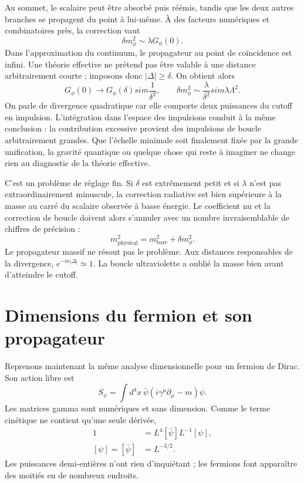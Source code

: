Au sommet, le scalaire peut être absorbé puis réémis, tandis que les deux autres branches se propagent du point à lui-même. À des facteurs numériques et combinatoires près, la correction vaut
\begin{equation}
\delta m_\phi^2\sim \lambda G_\phi(0).
\end{equation}
Dans l’approximation du continuum, le propagateur au point de coïncidence est infini. Une théorie effective ne prétend pas être valable à une distance arbitrairement courte ; imposons donc \(|\Delta|\geq\delta\). On obtient alors
\begin{equation}
G_\phi(0)\longrightarrow G_\phi(\delta)sim\frac{1}{\delta^2},
\qquad
\delta m_\phi^2\sim\frac{\lambda}{\delta^2}sim\lambda\Lambda^2.
\end{equation}
On parle de divergence quadratique car elle comporte deux puissances du cutoff en impulsion. L’intégration dans l’espace des impulsions conduit à la même conclusion : la contribution excessive provient des impulsions de boucle arbitrairement grandes. Que l’échelle minimale soit finalement fixée par la grande unification, la gravité quantique ou quelque chose qui reste à imaginer ne change rien au diagnostic de la théorie effective.

C’est un problème de réglage fin. Si \(\delta\) est extrêmement petit et si \(\lambda\) n’est pas extraordinairement minuscule, la correction radiative est bien supérieure à la masse au carré du scalaire observée à basse énergie. Le coefficient nu et la correction de boucle doivent alors s’annuler avec un nombre invraisemblable de chiffres de précision :
\begin{equation}
m_{\mathrm{physical}}^2
=m_{\mathrm{bare}}^2+\delta m_\phi^2.
\end{equation}
Le propagateur massif ne résout pas le problème. Aux distances responsables de la divergence, \(e^{-m|\Delta|}\simeq1\). La boucle ultraviolette a oublié la masse bien avant d’atteindre le cutoff.

\section{Dimensions du fermion et son propagateur}

Reprenons maintenant la même analyse dimensionnelle pour un fermion de Dirac. Son action libre est
\begin{equation}
S_\psi=\int d^4x\,
\bar\psi\left(i\gamma^\mu\partial_\mu-m\right)\psi.
\end{equation}
Les matrices gamma sont numériques et sans dimension. Comme le terme cinétique ne contient qu’une seule dérivée,
\begin{align}
1
&=L^4[\bar\psi]L^{-1}[\psi],\\
[\psi]=[\bar\psi]&=L^{-3/2}.
\end{align}
Les puissances demi-entières n’ont rien d’inquiétant ; les fermions font apparaître des moitiés en de nombreux endroits.

